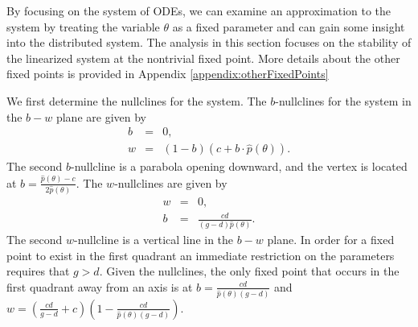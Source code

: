 \documentclass[12pt]{article}
\begin{document}
By focusing on the system of ODEs, we can examine an approximation to
the system by treating the variable $\theta$ as a fixed parameter and
can gain some insight into the distributed system. The analysis in
this section focuses on the stability of the linearized system at the
nontrivial fixed point. More details about the other fixed points is
provided in Appendix \ref{appendix:otherFixedPoints}

We first determine the nullclines for the system.
The $b$-nullclines for the system in the $b-w$ plane are given by
\begin{eqnarray}
  \label{eq:bnullclines}
  b & = & 0, \\
  w & = & (1-b)(c+b\cdot \hat{p}(\theta)).
\end{eqnarray}
The second $b$-nullcline is a parabola opening downward, and the vertex is located at
$b=\frac{\hat{p}(\theta)-c}{2\hat{p}(\theta)}$. The $w$-nullclines are given by
\begin{eqnarray}
  \label{eq:wnullclines}
  w & = & 0, \\
  b & = & \frac{cd}{(g-d)\hat{p}(\theta)}.
\end{eqnarray}
The second $w$-nullcline is a vertical line in the $b-w$ plane. In
order for a fixed point to exist in the first quadrant an immediate
restriction on the parameters requires that $g>d$.  Given the
nullclines, the only fixed point that occurs in the first quadrant
away from an axis is at $b=\frac{cd}{\hat{p}(\theta)(g-d)}$ and
$w=\left(\frac{cd}{g-d}+c\right)
\left(1-\frac{cd}{\hat{p}(\theta)(g-d)}\right)$.
\end{document}
